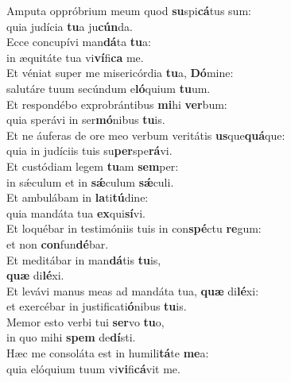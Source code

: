 \oddverse Amputa oppróbrium meum quod \textbf{su}spi\textbf{cá}tus sum:~\*\\
\oddverse quia judícia \textbf{tu}a ju\textbf{cún}da.\\
\evenverse Ecce concupívi man\textbf{dá}ta \textbf{tu}a:~\*\\
\evenverse in æquitáte tua vi\textbf{ví}fi\textbf{ca} me.\\
\oddverse Et véniat super me misericórdia \textbf{tu}a, \textbf{Dó}mine:~\*\\
\oddverse salutáre tuum secúndum e\textbf{ló}quium \textbf{tu}um.\\
\evenverse Et respondébo exprobrántibus \textbf{mi}hi \textbf{ver}bum:~\*\\
\evenverse quia sperávi in ser\textbf{mó}nibus \textbf{tu}is.\\
\oddverse Et ne áuferas de ore meo verbum veritátis \textbf{us}que\textbf{quá}que:~\*\\
\oddverse quia in judíciis tuis su\textbf{per}spe\textbf{rá}vi.\\
\evenverse Et custódiam legem \textbf{tu}am \textbf{sem}per:~\*\\
\evenverse in sǽculum et in \textbf{sǽ}culum \textbf{sǽ}culi.\\
\oddverse Et ambulábam in \textbf{la}ti\textbf{tú}dine:~\*\\
\oddverse quia mandáta tua \textbf{ex}qui\textbf{sí}vi.\\
\evenverse Et loquébar in testimóniis tuis in con\textbf{spé}ctu \textbf{re}gum:~\*\\
\evenverse et non \textbf{con}fun\textbf{dé}bar.\\
\oddverse Et meditábar in man\textbf{dá}tis \textbf{tu}is,~\*\\
\oddverse \textbf{quæ} di\textbf{lé}xi.\\
\evenverse Et levávi manus meas ad mandáta tua, \textbf{quæ} di\textbf{lé}xi:~\*\\
\evenverse et exercébar in justificati\textbf{ó}nibus \textbf{tu}is.\\
\oddverse Memor esto verbi tui \textbf{ser}vo \textbf{tu}o,~\*\\
\oddverse in quo mihi \textbf{spem} de\textbf{dí}sti.\\
\evenverse Hæc me consoláta est in humili\textbf{tá}te \textbf{me}a:~\*\\
\evenverse quia elóquium tuum vi\textbf{vi}fi\textbf{cá}vit me.\\
